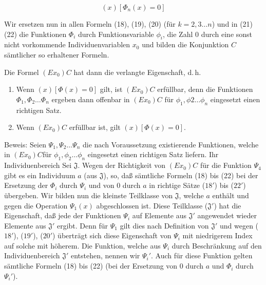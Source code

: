 \documentclass[draft]{scrartcl}
\let\oldleft\left
\let\oldright\right
\def\left#1{%
	    \global\advance\bracketnum1\relax 
		\colorlet{temp}{.}%
		    \csname bracketcolor\the\bracketnum\endcsname
			\oldleft#1%
			    \color{temp}%
	}
\def\right#1{%
	    \colorlet{temp}{.}%
		\csname bracketcolor\the\bracketnum\endcsname
		    \oldright#1%
			\global\advance\bracketnum-1\relax
			    \color{temp}%
	}
\def\left#1{#1}
\def\right#1{#1}
\begin{document}
\begin{equation}
\left(x\right)\left[\Phi_n\left(x\right) = 0\right]
\end{equation}

Wir ersetzen nun in allen Formeln (18), (19), (20) (für $k = 2, 3 \dots n$) und in (21) (22) die Funktionen $\Phi_i$ durch Funktionsvariable
$\phi_i$, die Zahl $0$ durch eine sonst nicht vorkommende 
Individuenvariablen $x_0$ und bilden die Konjunktion $C$ sämtlicher so erhaltener Formeln.

Die Formel $\left(Ex_0\right) C$ hat dann die verlangte Eigenschaft, d.\,h.

\begin{enumerate}
	\item Wenn $\left(x\right)\left[\Phi\left(x\right) = 0\right]$ gilt, ist $\left(Ex_0\right)C$ erfüllbar, denn die Funktionen $\Phi_1, \Phi_2 \dots \Phi_n$ ergeben dann offenbar in $\left(Ex_0\right)C$ für $\phi_1, \phi2 \dots \phi_n$ eingesetzt einen richtigen Satz.
	\item Wenn $\left(Ex_0\right)C$ erfüllbar ist, gilt $\left(x\right)\left[\Phi\left(x\right) = 0\right]$.
\end{enumerate}

Beweis: Seien $\Psi_1, \Psi_2 \dots \Psi_n$ die nach Voraussetzung
existierende Funktionen, welche in $\left(Ex_0\right)C$für 
$\phi_1, \phi_2 \dots \phi_n$ eingesetzt einen richtigen Satz liefern.
Ihr Individuenbereich Sei $\mathfrak{J}$. Wegen der Richtigkeit von 
$\left(Ex_0\right)C$ für die Funktion $\Psi_4$ gibt es ein Individuum $a$ 
(aus $\mathfrak{J}$), so, daß sämtliche Formeln (18) bis (22) 
bei der Ersetzung der $\Phi_i$ durch $\Psi_i$ und von 0 durch $a$ 
in richtige Sätze ($18'$) bis ($22'$) übergeben. Wir bilden nun 
die kleinste Teilklasse von $\mathfrak{J}$, welche $a$ enthält 
und gegen die Operation $\Psi_1\left(x\right)$ abgeschlossen ist. 
Diese Teilklasse ($\mathfrak{J}'$) hat die Eigenschaft, daß 
jede der Funktionen $\Psi_i$ auf Elemente aus $\mathfrak{J}'$ 
angewendet wieder Elemente aus $\mathfrak{J}'$ ergibt. 
Denn für $\Psi_1$ gilt dies nach Definition von $\mathfrak{J}'$ 
und wegen ($18'$), ($19'$), ($20'$) überträgt sich diese 
Eigenschaft von $\Psi_i$ mit niedrigerem Index auf solche mit höherem.
Die Funktion, welche aus $\Psi_i$ durch Beschränkung auf den 
Individuenbereich $\mathfrak{J}'$ entstehen, nennen wir
$\Psi_i'$. Auch für diese Funktion gelten sämtliche Formeln 
(18) bis (22) (bei der  Ersetzung von 0 durch $a$ und $\Phi_i$ durch $\Psi_i'$).
\end{document}
